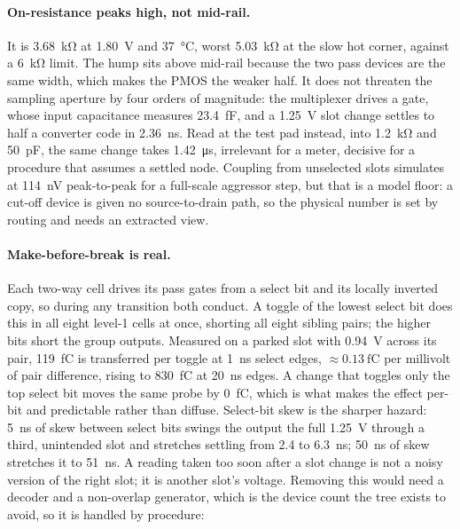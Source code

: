 \paragraph{On-resistance peaks high, not mid-rail.} It is \SI{3.68}{\kilo\ohm}
at \SI{1.80}{\volt} and \SI{37}{\celsius}, worst \SI{5.03}{\kilo\ohm} at the
slow hot corner, against a \SI{6}{\kilo\ohm} limit. The hump sits above mid-rail
because the two pass devices are the same width, which makes the PMOS the weaker
half. It does not threaten the sampling aperture by four orders of magnitude:
the multiplexer drives a gate, whose input capacitance measures
\SI{23.4}{\femto\farad}, and a \SI{1.25}{\volt} slot change settles to half a
converter code in \SI{2.36}{\nano\second}. Read at the test pad instead, into
\SI{1.2}{\kilo\ohm} and \SI{50}{\pico\farad}, the same change takes
\SI{1.42}{\micro\second}, irrelevant for a meter, decisive for a procedure
that assumes a settled node. Coupling from unselected slots simulates at
\SI{114}{\nano\volt} peak-to-peak for a full-scale aggressor step, but that is a
model floor: a cut-off device is given no source-to-drain path, so the physical
number is set by routing and needs an extracted view.

\paragraph{Make-before-break is real.} Each two-way cell drives its pass gates
from a select bit and its locally inverted copy, so during any transition both
conduct. A toggle of the lowest select bit does this in all eight level-1 cells
at once, shorting all eight sibling pairs; the higher bits short the group
outputs. Measured on a parked slot with \SI{0.94}{\volt} across its pair,
\SI{119}{\femto\coulomb} is transferred per toggle at \SI{1}{\nano\second}
select edges, \(\approx \SI{0.13}{\femto\coulomb}\) per millivolt of pair
difference, rising to \SI{830}{\femto\coulomb} at \SI{20}{\nano\second} edges. A
change that toggles only the top select bit moves the same probe by
\SI{0}{\femto\coulomb}, which is what makes the effect per-bit and predictable
rather than diffuse. Select-bit skew is the sharper hazard: \SI{5}{\nano\second}
of skew between select bits swings the output the full \SI{1.25}{\volt} through
a third, unintended slot and stretches settling from \num{2.4} to
\SI{6.3}{\nano\second}; \SI{50}{\nano\second} of skew stretches it to
\SI{51}{\nano\second}. A reading taken too soon after a slot change is not a
noisy version of the right slot; it is another slot's voltage. Removing this
would need a decoder and a non-overlap generator, which is the device count the
tree exists to avoid, so it is handled by procedure:


